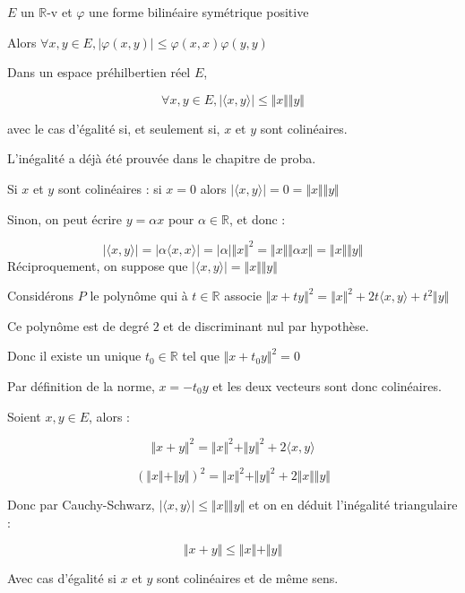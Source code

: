 \documentclass[a4paper,12pt]{book}
\newcommand{\Thr}[2]{\begin{tcolorbox}[sharp corners, colback=white,colframe=red!90!black!75, title=Théorème : #1]#2\end{tcolorbox}}
\newcommand{\Pre}[1]{\begin{tcolorbox}[sharp corners, colback=white,colframe=green!60!green!30!black!75, title=Preuve]#1\end{tcolorbox}}
\def\R{\mathbb{R}}
\begin{document}
\Thr{Cauchy-Schwarz}{$E$ un $\R$-v et $\varphi$ une forme bilinéaire symétrique positive
\par Alors $\forall x,y\in E, \vert\varphi(x,y)\vert\leq \varphi(x, x)\varphi(y,y)$
\par Dans un espace préhilbertien réel $E$, 
\par $$\forall x,y\in E, \vert\langle x,y\rangle \vert \leq \Vert x\Vert\Vert y\Vert$$
\par avec le cas d'égalité si, et seulement si, $x$ et $y$ sont colinéaires.}
\Pre{L'inégalité a déjà été prouvée dans le chapitre de proba.
\par Si $x$ et $y$ sont colinéaires : si $x=0$ alors $\vert\langle x,y\rangle\vert=0 = \Vert x\Vert \Vert y\Vert$
\par Sinon, on peut écrire $y=\alpha x$ pour $\alpha\in\R$, et donc :
\par $$\vert\langle x, y\rangle\vert = \vert\alpha\langle x, x\rangle\vert = \vert\alpha\vert\Vert x\Vert^2 = \Vert x\Vert\Vert\alpha x\Vert = \Vert x\Vert\Vert y\Vert$$
Réciproquement, on suppose que $\vert\langle x, y\rangle\vert = \Vert x\Vert\Vert y\Vert$
\par Considérons $P$ le polynôme qui à $t\in\R$ associe $\Vert x+ty\Vert^2 = \Vert x\Vert^2+2t\langle x,y\rangle+t^2\Vert y\Vert$
\par Ce polynôme est de degré $2$ et de discriminant nul par hypothèse.
\par Donc il existe un unique $t_0\in\R$ tel que $\Vert x+t_0y\Vert^2=0$
\par Par définition de la norme, $x=-t_0y$ et les deux vecteurs sont donc colinéaires.}
\Thr{Inégalit"é triangulaire}{Soient $x, y\in E$, alors :
\par $$\Vert x+y\Vert^2=\Vert x\Vert^2+\Vert y\Vert^2+2\langle x,y\rangle$$
\par $$(\Vert x\Vert+\Vert y\Vert)^2=\Vert x\Vert^2+\Vert y\Vert^2 + 2\Vert x\Vert\Vert y\Vert$$
\par Donc par Cauchy-Schwarz, $\vert\langle x, y\rangle\vert\leq \Vert x\Vert\Vert y\Vert$ et on en déduit l'inégalité triangulaire :
\par $$\Vert x+y\Vert\leq \Vert x\Vert+\Vert y\Vert$$
\par Avec cas d'égalité si $x$ et $y$ sont colinéaires et de même sens.}
\end{document}

